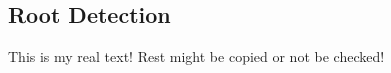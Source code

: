 \subsection{Root Detection}\label{subsection:counter-tampering-root}
This is my real text! Rest might be copied or not be checked!
